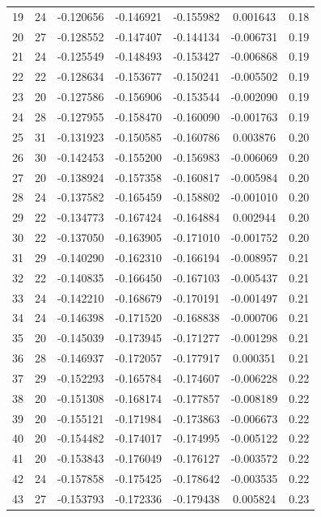 \documentclass[11pt]{article}
\begin{document}
\begin{longtable}{|c|c|c|c|c|c|c|}
19 & 24 & -0.120656 & -0.146921 & -0.155982 & 0.001643 & 0.18 \\
20 & 27 & -0.128552 & -0.147407 & -0.144134 & -0.006731 & 0.19 \\
21 & 24 & -0.125549 & -0.148493 & -0.153427 & -0.006868 & 0.19 \\
22 & 22 & -0.128634 & -0.153677 & -0.150241 & -0.005502 & 0.19 \\
23 & 20 & -0.127586 & -0.156906 & -0.153544 & -0.002090 & 0.19 \\
24 & 28 & -0.127955 & -0.158470 & -0.160090 & -0.001763 & 0.19 \\
25 & 31 & -0.131923 & -0.150585 & -0.160786 & 0.003876 & 0.20 \\
26 & 30 & -0.142453 & -0.155200 & -0.156983 & -0.006069 & 0.20 \\
27 & 20 & -0.138924 & -0.157358 & -0.160817 & -0.005984 & 0.20 \\
28 & 24 & -0.137582 & -0.165459 & -0.158802 & -0.001010 & 0.20 \\
29 & 22 & -0.134773 & -0.167424 & -0.164884 & 0.002944 & 0.20 \\
30 & 22 & -0.137050 & -0.163905 & -0.171010 & -0.001752 & 0.20 \\
31 & 29 & -0.140290 & -0.162310 & -0.166194 & -0.008957 & 0.21 \\
32 & 22 & -0.140835 & -0.166450 & -0.167103 & -0.005437 & 0.21 \\
33 & 24 & -0.142210 & -0.168679 & -0.170191 & -0.001497 & 0.21 \\
34 & 24 & -0.146398 & -0.171520 & -0.168838 & -0.000706 & 0.21 \\
35 & 20 & -0.145039 & -0.173945 & -0.171277 & -0.001298 & 0.21 \\
36 & 28 & -0.146937 & -0.172057 & -0.177917 & 0.000351 & 0.21 \\
37 & 29 & -0.152293 & -0.165784 & -0.174607 & -0.006228 & 0.22 \\
38 & 20 & -0.151308 & -0.168174 & -0.177857 & -0.008189 & 0.22 \\
39 & 20 & -0.155121 & -0.171984 & -0.173863 & -0.006673 & 0.22 \\
40 & 20 & -0.154482 & -0.174017 & -0.174995 & -0.005122 & 0.22 \\
41 & 20 & -0.153843 & -0.176049 & -0.176127 & -0.003572 & 0.22 \\
42 & 24 & -0.157858 & -0.175425 & -0.178642 & -0.003535 & 0.22 \\
43 & 27 & -0.153793 & -0.172336 & -0.179438 & 0.005824 & 0.23 \\

\end{longtable}
\end{document}
